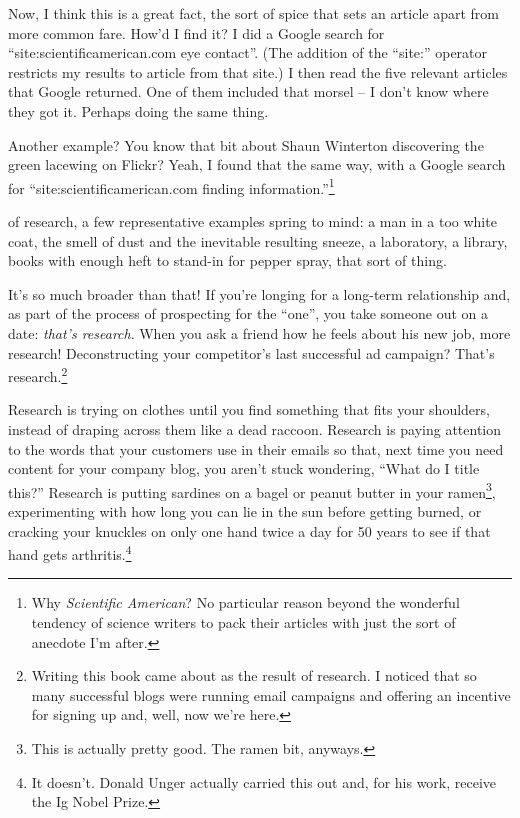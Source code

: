 Now, I think this is a great fact, the sort of spice that sets an article apart from more common fare. How'd I find it? I did a Google search for ``site:scientificamerican.com eye contact''. (The addition of the ``site:'' operator restricts my results to article from that site.) I then read the five relevant articles that Google returned. One of them included that morsel -- I don't know where they got it. Perhaps doing the same thing.

Another example? You know that bit about Shaun Winterton discovering the green
lacewing on Flickr? Yeah, I found that the same way, with a Google search for
``site:scientificamerican.com finding information.''\footnote{Why
  \textit{Scientific American}? No particular reason beyond the wonderful
  tendency of science writers to pack their articles with just the sort of
  anecdote I'm after.}

 of research, a few representative examples spring
to mind: a man in a too white coat, the smell of dust and the inevitable resulting
sneeze, a laboratory, a library, books with enough heft to stand-in for pepper spray, that sort
of thing.

It's so much broader than that! If you're longing for a long-term relationship
and, as part of the process of prospecting for the ``one'', you take someone out on a date: \textit{that's
  research}. When you ask a friend how he feels about his new job, more
research! Deconstructing your competitor's last successful ad campaign? That's
research.\footnote{Writing this book came about as the result of research. I
  noticed that so many successful blogs were running email campaigns and
  offering an incentive for signing up and, well, now we're here.}

Research is trying on clothes until you find something that fits your shoulders,
instead of draping across them like a dead raccoon. Research is paying attention
to the words that your customers use in their emails so that, next time you need
content for your company blog, you aren't stuck wondering, ``What do I title
this?'' Research is putting sardines on a bagel or peanut butter in your
ramen\footnote{This is actually pretty good. The ramen bit, anyways.}, experimenting with how long you
can lie in the sun before getting burned, or cracking your knuckles on only one
hand twice a day for 50 years to see if that hand gets arthritis.\footnote{It
  doesn't. Donald Unger actually carried this out and, for his work, receive the
  Ig Nobel Prize.}

